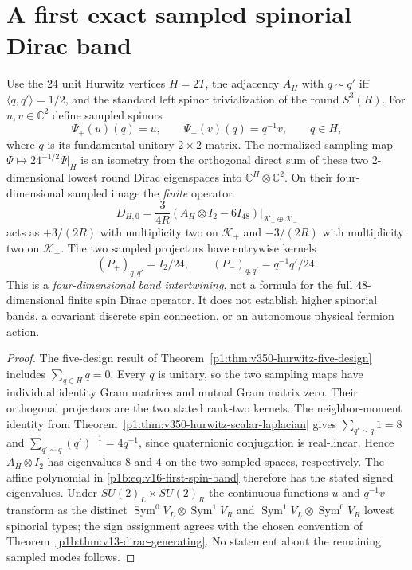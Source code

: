 \documentclass[11pt]{article}
\begin{document}
\section{A first exact sampled spinorial Dirac band}
\label{p1b:sec:v16-finite-spin}
\begin{theorem}
\label{p1b:thm:v16-hurwitz-spin-band}
Use the $24$ unit Hurwitz vertices $H=2T$, the adjacency $A_H$
with $q\sim q'$ iff $\langle q,q'\rangle=1/2$, and the
standard left spinor trivialization of the round $S^3(R)$.
For $u,v\in\mathbb C^2$ define sampled spinors
\[
\Psi_+(u)(q)=u,\qquad
\Psi_-(v)(q)=q^{-1}v,\qquad q\in H,
\]
where $q$ is its fundamental unitary $2\times2$ matrix.
The normalized sampling map $\Psi\mapsto24^{-1/2}\Psi|_H$
is an isometry from the orthogonal direct sum of these two
$2$-dimensional lowest round Dirac eigenspaces into
$\mathbb C^{H}\otimes\mathbb C^2$.  On their four-dimensional
sampled image the \emph{finite} operator
\begin{equation}
\boxed{D_{H,0}=\frac{3}{4R}
  (A_H\otimes I_2-6I_{48})\big|_{\mathscr K_+\oplus\mathscr K_-}}
\tag{T16.11}\label{p1b:eq:v16-first-spin-band}
\end{equation}
acts as $+3/(2R)$ with multiplicity two on
$\mathscr K_+$ and $-3/(2R)$ with multiplicity two on
$\mathscr K_-$.  The two sampled projectors have entrywise kernels
\[
  (P_+)_{q,q'}=I_2/24,\qquad
  (P_-)_{q,q'}=q^{-1}q'/24.
\]
This is a \emph{four-dimensional band intertwining}, not a
formula for the full $48$-dimensional finite spin Dirac operator.
It does not establish higher spinorial bands, a covariant discrete
spin connection, or an autonomous physical fermion action.
\end{theorem}
\begin{proof}
The five-design result of
Theorem~\ref{p1:thm:v350-hurwitz-five-design} includes
$\sum_{q\in H}q=0$.  Every $q$ is unitary, so the two
sampling maps have individual identity Gram matrices and mutual
Gram matrix zero.  Their orthogonal projectors are the two
stated rank-two kernels.
The neighbor-moment identity from
Theorem~\ref{p1:thm:v350-hurwitz-scalar-laplacian}
gives $\sum_{q'\sim q}1=8$ and
$\sum_{q'\sim q}(q')^{-1}=4q^{-1}$, since quaternionic
conjugation is real-linear.  Hence $A_H\otimes I_2$ has
eigenvalues $8$ and $4$ on the two sampled spaces, respectively.
The affine polynomial in \eqref{p1b:eq:v16-first-spin-band}
therefore has the stated signed eigenvalues.
Under $SU(2)_L\times SU(2)_R$ the continuous functions
$u$ and $q^{-1}v$ transform as the distinct
$\operatorname{Sym}^0 V_L\otimes\operatorname{Sym}^1 V_R$
and $\operatorname{Sym}^1 V_L\otimes\operatorname{Sym}^0 V_R$
lowest spinorial types; the sign assignment agrees with the
chosen convention of
Theorem~\ref{p1b:thm:v13-dirac-generating}.
No statement about the remaining sampled modes follows.
\end{proof}
\end{document}
